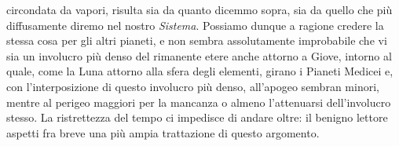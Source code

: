 \documentclass[11pt,twoside,openany]{book}
\begin{document}
circondata da vapori, risulta sia da quanto dicemmo sopra, sia da quello che più diffusamente diremo nel nostro \textit{Sistema}. Possiamo dunque a ragione credere la stessa cosa per gli altri pianeti, e non sembra assolutamente improbabile che vi sia un involucro più denso del rimanente etere anche attorno a Giove, intorno al quale, come la Luna attorno alla sfera degli elementi, girano i Pianeti Medicei e, con l'interposizione di questo involucro più denso, all'apogeo sembran minori, mentre al perigeo maggiori per la mancanza o almeno l'attenuarsi dell'involucro stesso. La ristrettezza del tempo ci impedisce di andare oltre: il benigno lettore aspetti fra breve una più ampia trattazione di questo argomento.

\end{document}
